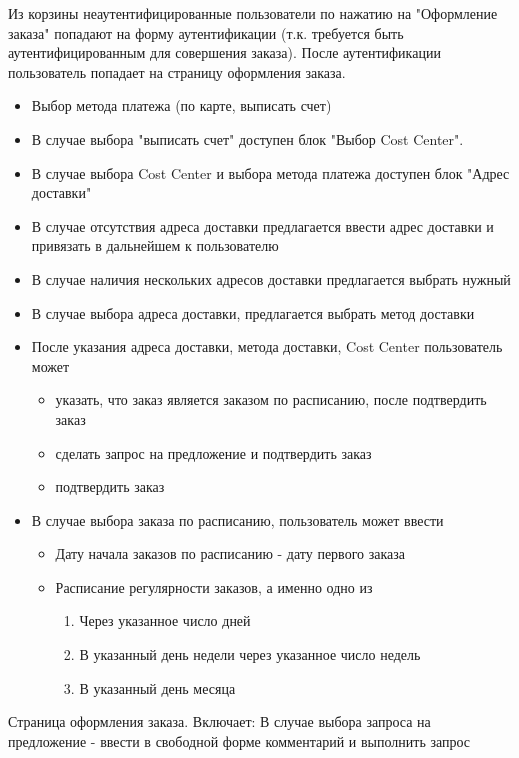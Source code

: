 {\begin{itogolong}
 Из корзины неаутентифицированные пользователи по нажатию на "Оформление заказа" попадают на форму аутентификации (т.к. требуется быть аутентифицированным для совершения заказа). После аутентификации пользователь попадает на страницу оформления заказа.
\begin{itemize}
\item Выбор метода платежа (по карте, выписать счет)
\item В случае выбора "выписать счет" доступен блок "Выбор Cost Center".
\item В случае выбора Cost Center и выбора метода платежа доступен блок "Адрес доставки"
\item В случае отсутствия адреса доставки предлагается ввести адрес доставки и привязать в дальнейшем к пользователю
\item В случае наличия нескольких адресов доставки предлагается выбрать нужный
\item В случае выбора адреса доставки, предлагается выбрать метод доставки
\item После указания адреса доставки, метода доставки, Cost Center пользователь может
\begin{itemize}
\item указать, что заказ является заказом по расписанию, после подтвердить заказ
\item сделать запрос на предложение и подтвердить заказ
\item подтвердить заказ
\end{itemize}
\item В случае выбора заказа по расписанию, пользователь может ввести
\begin{itemize}
\item Дату начала заказов по расписанию - дату первого заказа
\item Расписание регулярности заказов, а именно одно из
\begin{enumerate}
\item Через указанное число дней
\item В указанный день недели через указанное число недель
\item В указанный день месяца
\end{enumerate}
\end{itemize}
\end{itemize}
Страница оформления заказа. Включает:
В случае выбора запроса на предложение - ввести в свободной форме комментарий и выполнить запрос
\end{itogolong}
}
\ifcand
